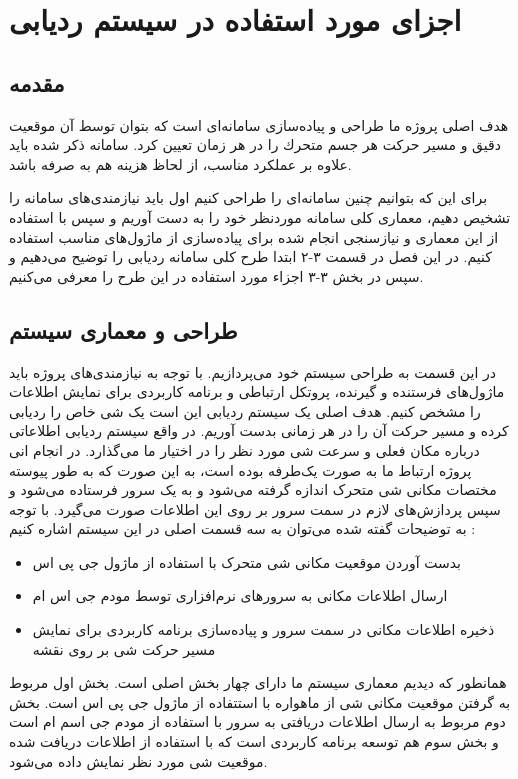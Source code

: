 \chapter{اجزای مورد استفاده در سیستم ردیابی}

\section{مقدمه}
هدف اصلی پروژه ما طراحی و پياده‌سازی سامانه‌ای است كه بتوان توسط آن موقعيت دقيق و مسير حركت هر جسم متحرك را در هر زمان تعيين كرد. سامانه ذکر شده باید علاوه بر عملکرد مناسب، از لحاظ هزینه هم به صرفه باشد.


برای این که بتوانیم چنین سامانه‌ای را طراحی کنیم اول باید نیازمندی‌های سامانه را تشخیص دهیم، معماری کلی سامانه موردنظر خود را به دست آوریم و سپس با استفاده از این معماری و نیازسنجی انجام شده برای پیاده‌سازی از ماژول‌های مناسب استفاده کنیم. در این فصل در قسمت ۳-۲ ابتدا طرح کلی سامانه ردیابی را توضیح می‌دهیم و سپس در بخش ۳-۳ اجزاء مورد استفاده در این طرح را معرفی می‌کنیم.
\section{طراحی و معماری سیستم}
در این قسمت به طراحی سیستم خود می‌پردازیم. با توجه به نیازمندی‌های پروژه باید ماژول‌های فرستنده و گیرنده، پروتکل ارتباطی و برنامه کاربردی برای نمایش اطلاعات را مشخص کنیم.
هدف اصلی یک سیستم ردیابی این است یک شی خاص را ردیابی کرده و مسیر حرکت آن را در هر زمانی بدست آوریم. در واقع سیستم ردیابی اطلاعاتی درباره مکان فعلی و سرعت شی مورد نظر را در اختیار ما می‌گذارد. در انجام انی پروژه ارتباط ما به صورت یک‌طرفه بوده است، به این صورت که به طور پیوسته مختصات مکانی شی متحرک اندازه گرفته می‌شود و به یک سرور فرستاده می‌شود و سپس پردازش‌های لازم در سمت سرور بر روی این اطلاعات صورت می‌گیرد. با توجه به توضیحات گفته شده می‌توان به سه قسمت اصلی در این سیستم اشاره کنیم \cite{bidabad}:
\begin{itemize}
	\item
بدست آوردن موقعیت مکانی شی متحرک با استفاده از ماژول جی پی اس
	\item
	ارسال اطلاعات مکانی به سرورهای نرم‌افزاری توسط مودم جی اس ام
	\item
	ذخیره اطلاعات مکانی در سمت سرور و پیاده‌سازی برنامه کاربردی برای نمایش مسیر حرکت شی بر روی نقشه
\end{itemize} 
همانطور که دیدیم معماری سیستم ما دارای چهار بخش اصلی است. بخش اول مربوط به گرفتن موقعیت مکانی شی از ماهواره با استتفاده از ماژول جی پی اس است. بخش دوم مربوط به ارسال اطلاعات دریافتی به سرور با استفاده از مودم جی اسم ام است و بخش سوم هم توسعه برنامه کاربردی است که با استفاده از اطلاعات دریافت شده موقعیت شی مورد نظر نمایش داده می‌شود.

